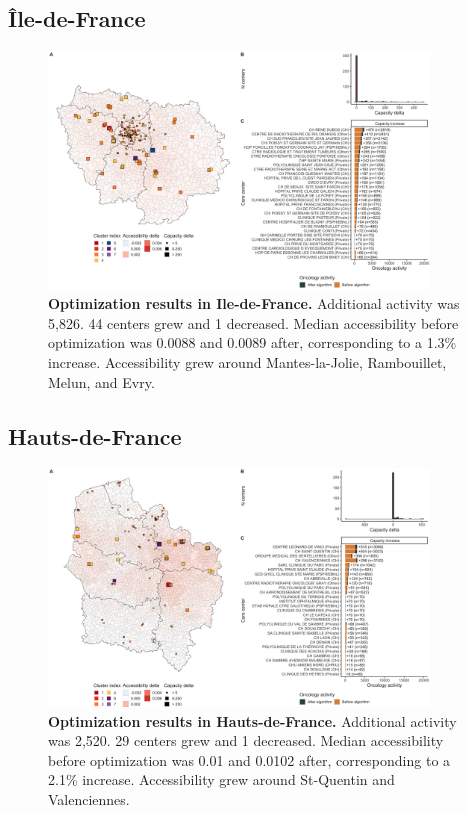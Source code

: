 \subsection*{Île-de-France}

\begin{figure}[H]
    \includegraphics[width=0.9\textwidth]{images/camion/optim_region/optim_Ile-de-France.png}
    \centering
    \caption{
        \textbf{Optimization results in Ile-de-France.} Additional activity was 5,826. 44 centers grew and 1 decreased. Median accessibility before optimization was 0.0088 and 0.0089 after, corresponding to a 1.3\% increase. Accessibility grew around Mantes-la-Jolie, Rambouillet, Melun, and Evry.
    }
\end{figure}

\subsection*{Hauts-de-France}

\begin{figure}[H]
    \includegraphics[width=0.9\textwidth]{images/camion/optim_region/optim_Hauts-de-France.png}
    \centering
    \caption{
        \textbf{Optimization results in Hauts-de-France.} Additional activity was 2,520. 29 centers grew and 1 decreased. Median accessibility before optimization was 0.01 and 0.0102 after, corresponding to a 2.1\% increase. Accessibility grew around St-Quentin and Valenciennes.
    }
\end{figure}

